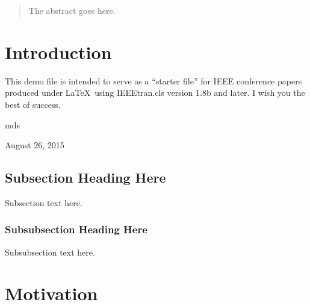 \documentclass[conference]{IEEEtran}
\begin{document}




\maketitle
\newpage

\begin{abstract}
The abstract goes here.
\end{abstract}





%
\IEEEpeerreviewmaketitle



\section{Introduction}
This demo file is intended to serve as a ``starter file''
for IEEE conference papers produced under \LaTeX\ using
IEEEtran.cls version 1.8b and later.
I wish you the best of success.

\hfill mds
 
\hfill August 26, 2015

\subsection{Subsection Heading Here}
Subsection text here.


\subsubsection{Subsubsection Heading Here}
Subsubsection text here.


\section {Motivation}
\end{document}
